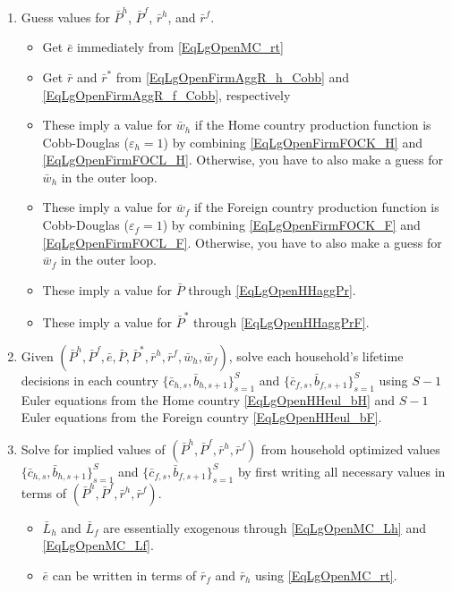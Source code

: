 \documentclass[letterpaper,12pt]{article}
\theoremstyle{definition}
\newcommand\ve{\varepsilon}
\begin{document}
    \begin{enumerate}
      \item Guess values for $\bar{P}^h$, $\bar{P}^f$, $\bar{r}^h$, and $\bar{r}^f$.
      \begin{itemize}
        \item Get $\bar{e}$ immediately from \eqref{EqLgOpenMC_rt}
        \item Get $\bar{r}$ and $\bar{r}^*$ from \eqref{EqLgOpenFirmAggR_h_Cobb} and \eqref{EqLgOpenFirmAggR_f_Cobb}, respectively
        \item These imply a value for $\bar{w}_h$ if the Home country production function is Cobb-Douglas ($\ve_h=1$) by combining \eqref{EqLgOpenFirmFOCK_H} and \eqref{EqLgOpenFirmFOCL_H}. Otherwise, you have to also make a guess for $\bar{w}_h$ in the outer loop.
        \item These imply a value for $\bar{w}_f$ if the Foreign country production function is Cobb-Douglas ($\ve_f=1$) by combining \eqref{EqLgOpenFirmFOCK_F} and \eqref{EqLgOpenFirmFOCL_F}. Otherwise, you have to also make a guess for $\bar{w}_f$ in the outer loop.
        \item These imply a value for $\bar{P}$ through \eqref{EqLgOpenHHaggPr}.
        \item These imply a value for $\bar{P}^*$ through \eqref{EqLgOpenHHaggPrF}.
      \end{itemize}
      \item Given $\left(\bar{P}^h, \bar{P}^f, \bar{e}, \bar{P}, \bar{P}^*, \bar{r}^h, \bar{r}^f, \bar{w}_h, \bar{w}_f\right)$, solve each household's lifetime decisions in each country $\{\bar{c}_{h,s},\bar{b}_{h,s+1}\}_{s=1}^S$ and $\{\bar{c}_{f,s},\bar{b}_{f,s+1}\}_{s=1}^S$ using $S-1$ Euler equations from the Home country \eqref{EqLgOpenHHeul_bH} and $S-1$ Euler equations from the Foreign country \eqref{EqLgOpenHHeul_bF}.
      \item Solve for implied values of $\left(\bar{P}^h, \bar{P}^f, \bar{r}^h, \bar{r}^f\right)$ from household optimized values $\{\bar{c}_{h,s},\bar{b}_{h,s+1}\}_{s=1}^S$ and $\{\bar{c}_{f,s},\bar{b}_{f,s+1}\}_{s=1}^S$ by first writing all necessary values in terms of $\left(\bar{P}^h, \bar{P}^f, \bar{r}^h, \bar{r}^f\right)$.
      \begin{itemize}
        \item $\bar{L}_h$ and $\bar{L}_f$ are essentially exogenous through \eqref{EqLgOpenMC_Lh} and \eqref{EqLgOpenMC_Lf}.
        \item $\bar{e}$ can be written in terms of $\bar{r}_f$ and $\bar{r}_h$ using \eqref{EqLgOpenMC_rt}.

\end{itemize}
\end{enumerate}
\end{document}
